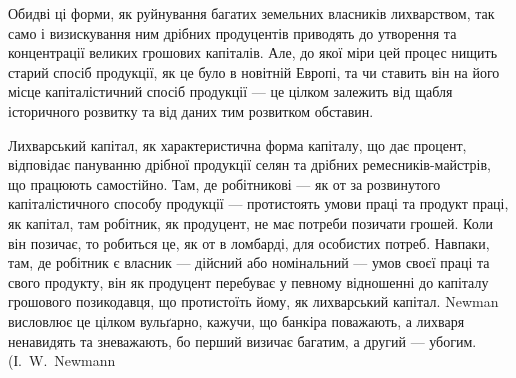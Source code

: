 Обидві ці форми, як руйнування багатих земельних власників лихварством,
так само і визискування ним дрібних продуцентів приводять до утворення та
концентрації великих грошових капіталів. Але, до якої міри цей процес нищить
старий спосіб продукції, як це було в новітній Европі, та чи ставить він на
його місце капіталістичний спосіб продукції — це цілком залежить від щабля
історичного розвитку та від даних тим розвитком обставин.

Лихварський капітал, як характеристична форма капіталу, що дає процент,
відповідає пануванню дрібної продукції селян та дрібних ремесників-майстрів,
що працюють самостійно. Там, де робітникові — як от за розвинутого капіталістичного
способу продукції — протистоять умови праці та продукт праці, як капітал,
там робітник, як продуцент, не має потреби позичати грошей. Коли він позичає, то
робиться це, як от в ломбарді, для особистих потреб. Навпаки, там, де робітник
є власник — дійсний або номінальний — умов своєї праці та свого продукту, він
як продуцент перебуває у певному відношенні до капіталу грошового позикодавця,
що протистоїть йому, як лихварський капітал. Newman висловлює це
цілком вульґарно, кажучи, що банкіра поважають, а лихваря ненавидять та зневажають,
бо перший визичає багатим, а другий — убогим. (І.~W.~Newmann
\parbreak{}  %
